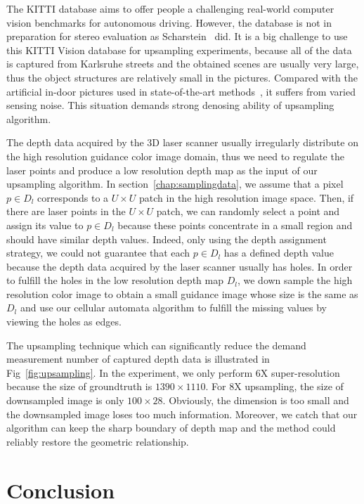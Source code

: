\documentclass[preprint,10pt,5p,times,twocolumn]{elsarticle}
\begin{document}
The KITTI database aims to offer people a challenging real-world computer vision benchmarks for autonomous driving. However, the database is not in preparation for stereo evaluation  as Scharstein~\cite{Scharstein02} did. It is a big challenge to use this KITTI Vision database for upsampling experiments, because all of the data is captured from Karlsruhe streets and the obtained scenes are usually very large, thus the object structures are relatively small in the pictures. Compared with the artificial in-door pictures used in state-of-the-art methods~\cite{DT05,YYDN07,PKTBK11,HKD11}, it suffers from varied sensing noise. This situation demands strong denosing ability of upsampling algorithm.

The depth data acquired by the 3D laser scanner usually irregularly distribute on the high resolution guidance color image domain, thus we need to regulate the laser points and produce a low resolution depth map as the input of our upsampling algorithm. In section~\ref{chap:samplingdata}, we assume that a pixel $p \in D_l$ corresponds to a $U \times U$ patch in the high resolution image space. Then, if there are laser points in the $U \times U$ patch, we can randomly select a point and assign its value to $p \in D_l$ because these points concentrate in a small region and should have similar depth values. Indeed, only using the depth assignment strategy, we could not guarantee that each $p \in D_l$ has a defined depth value because the depth data acquired by the laser scanner usually has holes. In order to fulfill the holes in the low resolution depth map $D_l$, we down sample the high resolution color image to obtain a small guidance image whose size is the same as $D_l$ and use our cellular automata algorithm to fulfill the missing values by viewing the holes as edges.

The upsampling technique which can significantly reduce the demand measurement number of captured depth data is  illustrated in Fig~\ref{fig:upsampling}. In the experiment, we only perform $6$X super-resolution because the size of groundtruth is $1390 \times 1110$. For $8$X upsampling, the size of downsampled image is only  $100 \times 28$. Obviously, the dimension is too small and the downsampled image loses too much information. Moreover, we catch that our algorithm can keep the sharp boundary of depth map and the method could reliably restore the geometric relationship.

\section{Conclusion}
\label{chap:conclusion}
\end{document}
